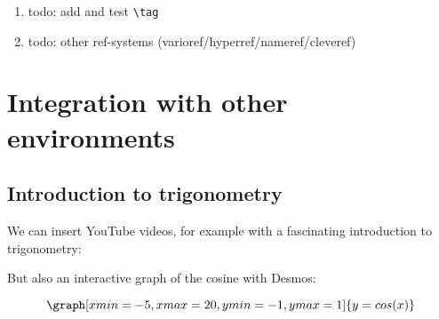 \documentclass{ximera}
\begin{document}
\begin{enumerate}
	\item todo: add and test \verb|\tag|
	\item todo: other ref-systems (varioref/hyperref/nameref/cleveref) 
\end{enumerate}


\section{Integration with other environments} \label{sec:showCase:integratie}

\subsection{Introduction to trigonometry}

We can insert YouTube videos, for example with a fascinating introduction to trigonometry:
\begin{center}
\end{center}


But also an interactive graph of the cosine with Desmos:

\[  
\graph[xmin=-5,xmax=20,ymin=-1,ymax=1]{y=cos(x)}  
\] 

\end{document}
